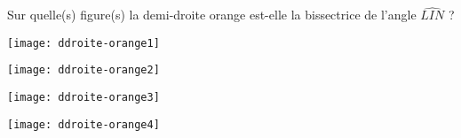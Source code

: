 \begin{QCM}
\begin{GroupeQCM}
    
    \begin{exercice}
     Sur quelle(s) figure(s) la demi-droite orange est-elle la bissectrice de l'angle $\widehat{LIN}$ ?
      \begin{ChoixQCM}{4}
      \item \texttt{[image: ddroite-orange1]}
      \item \texttt{[image: ddroite-orange2]}
      \item \texttt{[image: ddroite-orange3]}
      \item \texttt{[image: ddroite-orange4]}
      \end{ChoixQCM}
\begin{corrige}
   \end{corrige}
    \end{exercice}
\end{GroupeQCM}
\end{QCM}

  
